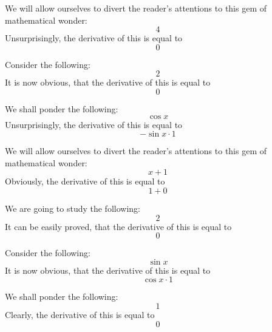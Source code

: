 \documentclass{article}
\begin{document}
We will allow ourselves to divert the reader's attentions to this gem of mathematical wonder:
\begin{equation}
4 
\end{equation}
Unsurprisingly, the derivative of this is equal to
\begin{equation}
0 
\end{equation}

Consider the following:
\begin{equation}
2 
\end{equation}
It is now obvious, that the derivative of this is equal to
\begin{equation}
0 
\end{equation}

We shall ponder the following:
\begin{equation}
\cos x 
\end{equation}
Unsurprisingly, the derivative of this is equal to
\begin{equation}
-\sin x \cdot 1 
\end{equation}

We will allow ourselves to divert the reader's attentions to this gem of mathematical wonder:
\begin{equation}
x + 1 
\end{equation}
Obviously, the derivative of this is equal to
\begin{equation}
1 + 0 
\end{equation}

We are going to study the following:
\begin{equation}
2 
\end{equation}
It can be easily proved, that the derivative of this is equal to
\begin{equation}
0 
\end{equation}

Consider the following:
\begin{equation}
\sin x 
\end{equation}
It is now obvious, that the derivative of this is equal to
\begin{equation}
\cos x \cdot 1 
\end{equation}

We shall ponder the following:
\begin{equation}
1 
\end{equation}
Clearly, the derivative of this is equal to
\begin{equation}
0 
\end{equation}
\end{document}
